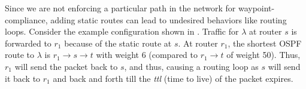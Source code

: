 			
 \label{sec:loopavoidance}
Since we are not enforcing a particular path in the network 
for waypoint-compliance, adding
static routes can lead to undesired behaviors like routing loops.  
Consider the example configuration shown in . 
Traffic for $\lambda$ at router $s$ is forwarded to $r_1$ because of the
static route at $s$. At router $r_1$, the shortest OSPF route to
$\lambda$ is $r_1 \rightarrow s \rightarrow t$ with weight 6 (compared 
to $r_1 \rightarrow t$ of weight 50). Thus, $r_1$ will send the 
packet back to $s$, and thus, causing a routing loop as $s$ will send
it back to $r_1$ and back and forth till the \emph{ttl} (time to live) of the
packet expires. 

